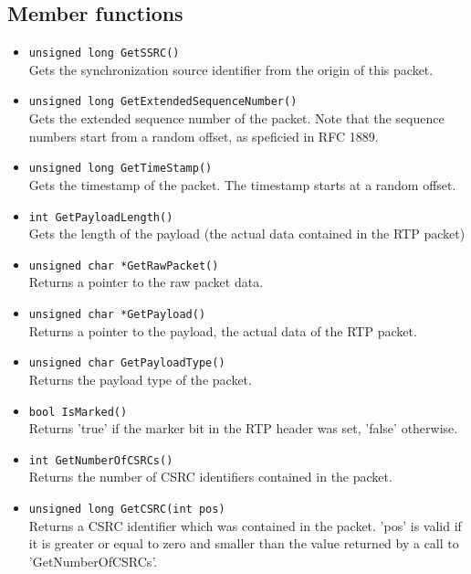 \subsection{Member functions}
\begin{itemize}

\item {\tt unsigned long GetSSRC()}\\
	Gets the synchronization source identifier from the origin of this
	packet.

\item {\tt unsigned long GetExtendedSequenceNumber()}\\
	Gets the extended sequence number of the packet. Note that the
	sequence numbers start from a random offset, as speficied in RFC 1889.

\item {\tt unsigned long GetTimeStamp()}\\
	Gets the timestamp of the packet. The timestamp starts at a random
	offset.

\item {\tt int GetPayloadLength()}\\
	Gets the length of the payload (the actual data contained in the
	RTP packet)

\item {\tt unsigned char *GetRawPacket()}\\
	Returns a pointer to the raw packet data.

\item {\tt unsigned char *GetPayload()}\\
	Returns a pointer to the payload, the actual data of the RTP packet.

\item {\tt unsigned char GetPayloadType()}\\
 	Returns the payload type of the packet.

\item {\tt bool IsMarked()}\\
 	Returns 'true' if the marker bit in the RTP header was set, 'false'
 	otherwise.
 	
\item {\tt int GetNumberOfCSRCs()}\\
 	Returns the number of CSRC identifiers contained in the packet.
 	
\item {\tt unsigned long GetCSRC(int pos)}\\
 	Returns a CSRC identifier which was contained in the packet. 'pos'
 	is valid if it is greater or equal to zero and smaller than the
 	value returned by a call to 'GetNumberOfCSRCs'.


\end{itemize}
